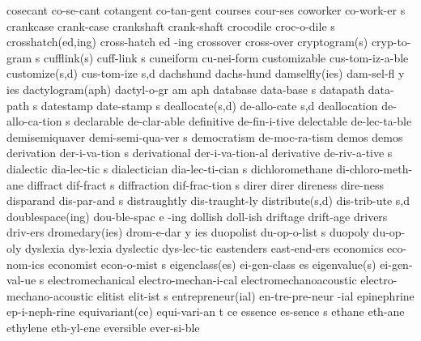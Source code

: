 \1 cosecant		co-se-cant
\1 cotangent		co-tan-gent
\1 courses		cour-ses
\5 coworker		co-work-er s		%
\1 crankcase		crank-case		%
\1 crankshaft		crank-shaft
\5 crocodile		croc-o-dile s
\2 crosshatch(ed,ing)	cross-hatch ed -ing
\1 crossover		cross-over		%
\2 cryptogram(s)	cryp-to-gram s		%
\2 cufflink(s)		cuff-link s		%
\1 cuneiform		cu-nei-form		%
\1 customizable		cus-tom-iz-a-ble	%
\2 customize(s,d)	cus-tom-ize s,d		%
\1 dachshund		dachs-hund
\3 damselfly(ies)	dam-sel-fl y ies	%
\3 dactylogram(aph)	dactyl-o-gr am aph	%
\5 database		data-base s
\5 datapath		data-path s
\5 datestamp		date-stamp s            %
\NewWordtrue
\2 deallocate(s,d)	de-allo-cate s,d	%
\NewWordtrue
\5 deallocation		de-allo-ca-tion s	%
\1 declarable		de-clar-able
\1 definitive		de-fin-i-tive
\1 delectable		de-lec-ta-ble
\5 demisemiquaver	demi-semi-qua-ver s	%
\1 democratism		de-moc-ra-tism
\1 demos		demos	
\NewWordtrue
\5 derivation		der-i-va-tion s		%
\NewWordtrue
\1 derivational		der-i-va-tion-al	%
\5 derivative		de-riv-a-tive s
\5 dialectic		dia-lec-tic s		%
\5 dialectician		dia-lec-ti-cian s	%
\1 dichloromethane	di-chloro-meth-ane	%
\5 diffract		dif-fract s
\5 diffraction		dif-frac-tion s		%
\1 direr		direr
\1 direness		dire-ness
\5 disparand		dis-par-and s
\1 distraughtly		dis-traught-ly
\2 distribute(s,d)	dis-trib-ute s,d
\3 doublespace(ing)	dou-ble-spac e -ing
\1 dollish		doll-ish
\1 driftage		drift-age
\1 drivers		driv-ers             %
\3 dromedary(ies)	drom-e-dar y ies
\5 duopolist		du-op-o-list s
\1 duopoly		du-op-oly
\1 dyslexia		dys-lexia		%
\1 dyslectic		dys-lec-tic		%
\1 eastenders		east-end-ers
\1 economics		eco-nom-ics
\5 economist		econ-o-mist s
\2 eigenclass(es)	ei-gen-class es		%
\2 eigenvalue(s)	ei-gen-val-ue s		%
\1 electromechanical	electro-mechan-i-cal
\1 electromechanoacoustic  electro-mechano-acoustic
\5 elitist		elit-ist s
\2 entrepreneur(ial)	en-tre-pre-neur -ial
\1 epinephrine		ep-i-neph-rine
\3 equivariant(ce)	equi-vari-an t ce
\NewWordtrue
\5 essence		es-sence s		%
\1 ethane		eth-ane			%
\1 ethylene		eth-yl-ene
\1 eversible		ever-si-ble
